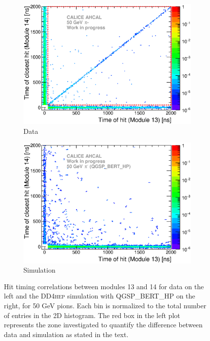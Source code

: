 \documentclass[a4paper]{article}
\newcommand\ddhep{\textsc{DD4hep}\xspace}
\begin{document}
\begin{figure}[htbp!]
  \begin{subfigure}[t]{0.49\textwidth}
    \centering
    \includegraphics[width=1\textwidth]{../Draft/fig/Time_Correlation_long.eps}
    \caption{Data} \label{fig:TimeCorr_Data_long_50GeV}
  \end{subfigure}
  \hfill
  \begin{subfigure}[t]{0.49\textwidth}
    \centering
    \includegraphics[width=1\textwidth]{../Draft/fig/Time_Correlation_50GeV_long_QGSPBERTHP_DD4hep.eps}
    \caption{Simulation} \label{fig:TimeCorr_Data_long_50GeV_Sim}
  \end{subfigure}
  \caption{Hit timing correlations between modules 13 and 14 for data on the left and the \ddhep simulation with QGSP\_BERT\_HP on the right, for 50 GeV pions. Each bin is normalized to the total number of entries in the 2D histogram. The red box in the left plot represents the zone investigated to quantify the difference between data and simulation as stated in the text.}
  \label{fig:TimeCorr_long_50GeV}
\end{figure}
\end{document}
